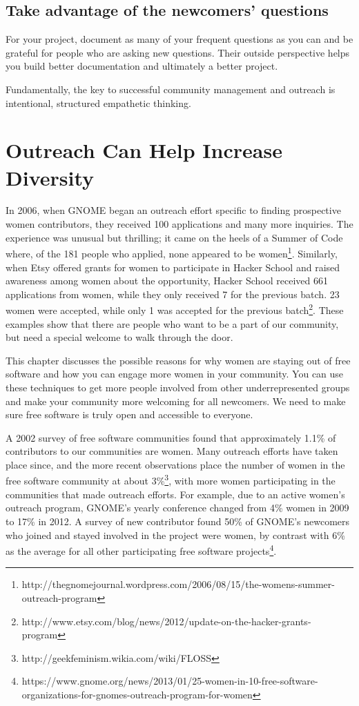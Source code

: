 \subsection{Take advantage of the newcomers’ questions}
For your project, document as many of your frequent questions as you can and be grateful for people who are asking new questions. Their outside perspective helps you build better documentation and ultimately a better project. 

Fundamentally, the key to successful community management and outreach is intentional, structured empathetic thinking.

\section{Outreach Can Help Increase Diversity}
In 2006, when GNOME began an outreach effort specific to finding prospective women contributors, they received 100 applications and many more inquiries. The experience was unusual but thrilling; it came on the heels of a Summer of Code where, of the 181 people who applied, none appeared to be women\footnote{http://thegnomejournal.wordpress.com/2006/08/15/the-womens-summer-outreach-program}. Similarly, when Etsy offered grants for women to participate in Hacker School and raised awareness among women about the opportunity, Hacker School received 661 applications from women, while they only received 7 for the previous batch. 23 women were accepted, while only 1 was accepted for the previous batch\footnote{http://www.etsy.com/blog/news/2012/update-on-the-hacker-grants-program}. These examples show that there are people who want to be a part of our community, but need a special welcome to walk through the door.

This chapter discusses the possible reasons for why women are staying out of free software and how you can engage more women in your community. You can use these techniques to get more people involved from other underrepresented groups and make your community more welcoming for all newcomers. We need to make sure free software is truly open and accessible to everyone.

A 2002 survey of free software communities found that approximately 1.1\% of contributors to our communities are women. Many outreach efforts have taken place since, and the more recent observations place the number of women in the free software community at about 3\%\footnote{http://geekfeminism.wikia.com/wiki/FLOSS}, with more women participating in the communities that made outreach efforts. For example, due to an active women’s outreach program, GNOME’s yearly conference changed from 4\% women in 2009 to 17\% in 2012. A survey of new contributor found 50\% of GNOME’s newcomers who joined and stayed involved in the project were women, by contrast with 6\% as the average for all other participating free software projects\footnote{https://www.gnome.org/news/2013/01/25-women-in-10-free-software-organizations-for-gnomes-outreach-program-for-women}.

